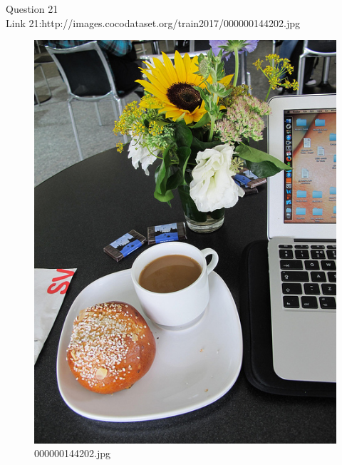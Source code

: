 Question 21\\
Link 21:http://images.cocodataset.org/train2017/000000144202.jpg
    \begin{figure}[h]
        \centering
        \includegraphics[width=0.8\linewidth]{../image set/easy/000000144202.jpg}
        \caption{000000144202.jpg}
    \end{figure}
